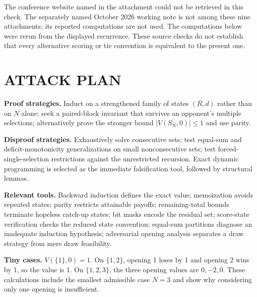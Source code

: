 \documentclass[11pt,a4paper]{article}
\theoremstyle{definition}\newtheorem{definition}[theorem]{Definition}
\theoremstyle{remark}\newtheorem{remark}[theorem]{Remark}
\newcommand{\1}{\mathbf 1}
\begin{document}
The conference website named in the attachment could not be retrieved in this check. The separately named October 2026 working note is not among these nine attachments; its reported computations are not used. The computations below were rerun from the displayed recurrence. These source checks do not establish that every alternative scoring or tie convention is equivalent to the present one.

\section{ATTACK PLAN}
\textbf{Proof strategies.} Induct on a strengthened family of states $(R,d)$ rather than on $N$ alone; seek a paired-block invariant that survives an opponent's multiple selections; alternatively prove the stronger bound $|V(S_N,0)|\le1$ and use parity.

\textbf{Disproof strategies.} Exhaustively solve consecutive sets; test equal-sum and deficit-monotonicity generalizations on small nonconsecutive sets; test forced-single-selection restrictions against the unrestricted recursion. Exact dynamic programming is selected as the immediate falsification tool, followed by structural lemmas.

\textbf{Relevant tools.} Backward induction defines the exact value; memoization avoids repeated states; parity restricts attainable payoffs; remaining-total bounds terminate hopeless catch-up states; bit masks encode the residual set; score-state verification checks the reduced state convention; equal-sum partitions diagnose an inadequate induction hypothesis; adversarial opening analysis separates a draw strategy from mere draw feasibility.

\textbf{Tiny cases.} $V(\{1\},0)=1$. On $\{1,2\}$, opening 1 loses by 1 and opening 2 wins by 1, so the value is 1. On $\{1,2,3\}$, the three opening values are $0,-2,0$. These calculations include the smallest admissible case $N=3$ and show why considering only one opening is insufficient.
\end{document}
